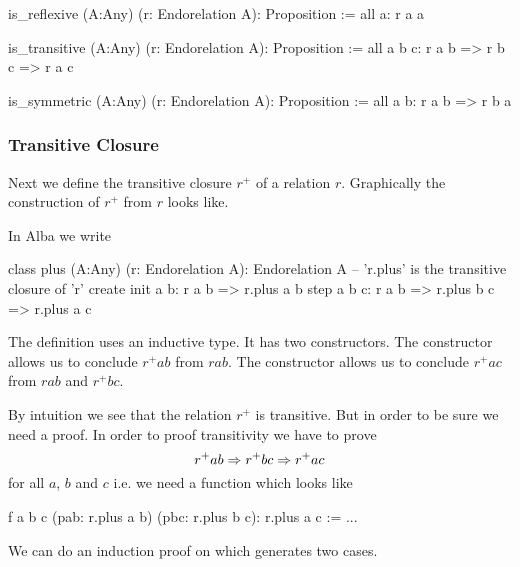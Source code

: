 \begin{alba}
  is_reflexive (A:Any) (r: Endorelation A): Proposition :=
    all a: r a a

  is_transitive (A:Any) (r: Endorelation A): Proposition :=
    all a b c: r a b => r b c => r a c

  is_symmetric (A:Any) (r: Endorelation A): Proposition :=
    all a b: r a b => r b a
\end{alba}



\subsubsection{Transitive Closure}

Next we define the transitive closure $r^+$ of a relation $r$. Graphically the
construction of $r^+$ from $r$ looks like.



In Alba we write

\begin{alba}
    class
        plus (A:Any) (r: Endorelation A): Endorelation A
            -- 'r.plus' is the transitive closure of 'r'
    create
        init a b:
            r a b
            => r.plus a b
        step a b c:
            r a b
            => r.plus b c
            => r.plus a c
\end{alba}

The definition uses an inductive type. It has two constructors. The
 constructor allows us to conclude $r^+ a b$ from $r a b$.  The
 constructor allows us to conclude $r^+ a c$ from $r a b$ and $r^+
b c$.

By intuition we see that the relation $r^+$ is transitive. But in
order to be sure we need a proof. In order to proof transitivity we have to
prove
%
$$
 r^+ a b \Rightarrow r^+ b c \Rightarrow r^+ a c
$$
%
for all $a$, $b$ and $c$
i.e. we need a function which looks like
%
\begin{alba}
  f a b c (pab: r.plus a b) (pbc: r.plus b c): r.plus a c :=
    ...
\end{alba}
%
We can do an induction proof on  which generates two
cases.

